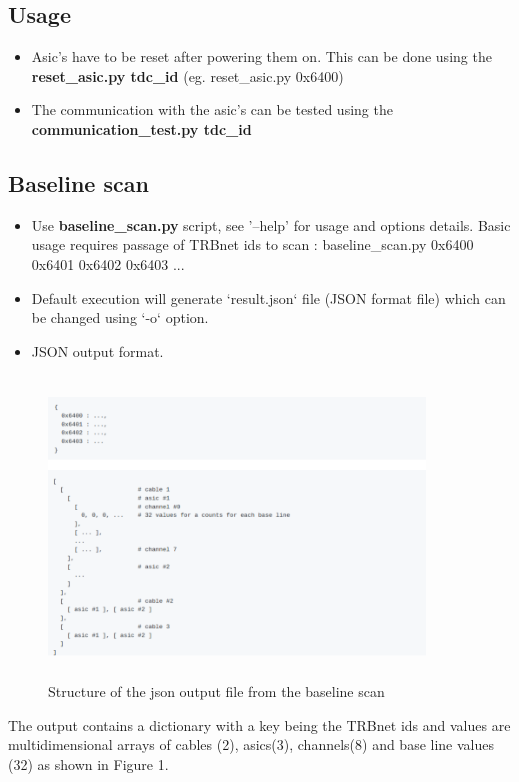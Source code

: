 \documentclass{article}
\begin{document}
\subsection*{Usage}

\begin{itemize}
  \item Asic's have to be reset after powering them on. This can be done using the \textbf{reset\_asic.py tdc\_id} (eg. reset\_asic.py 0x6400) 
  \item The communication with the asic's can be tested using the \textbf{communication\_test.py tdc\_id}
\end{itemize}

\subsection*{Baseline scan}
\begin{itemize}
  \item Use \textbf{baseline\_scan.py} script, see '--help' for usage and options details. Basic usage requires passage of TRBnet ids to scan : baseline\_scan.py 0x6400 0x6401 0x6402 0x6403 ...
\item Default execution will generate `result.json` file (JSON format file) which can be changed using `-o` option.
\item JSON output format.
\end{itemize}

\begin{figure}
\centering
\includegraphics[width=10cm,height=8cm]{json_out.png}
\caption{Structure of the json output file from the baseline scan }
\end{figure}

The output contains a dictionary with a key being the TRBnet ids and values are multidimensional arrays of cables (2), asics(3), channels(8) and base line values (32) as shown in Figure 1.
\end{document}
